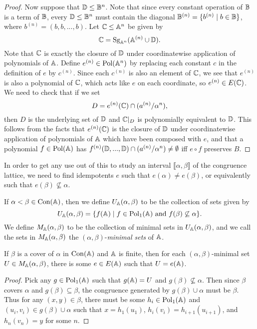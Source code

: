 \begin{appendices}
\begin{proof}
Now suppose that $\mathbb{D} \le \mathbb{B}^n$. Note that since every constant operation of $\mathbb{B}$ is a term of $\mathbb{B}$, every $\mathbb{D} \le \mathbb{B}^n$ must contain the diagonal $\mathbb{B}^{(n)} = \{b^{(n)} \mid b \in \mathbb{B}\}$, where $b^{(n)} = (b, b, ..., b)$. Let $\mathbb{C} \le \mathbb{A}^n$ be given by
\[
\mathbb{C} = \operatorname{Sg}_{\mathbb{A}^n}(\mathbb{A}^{(n)} \cup \mathbb{D}).
\]
Note that $\mathbb{C}$ is exactly the closure of $\mathbb{D}$ under coordinatewise application of polynomials of $\mathbb{A}$. Define $e^{(n)} \in \operatorname{Pol}(\mathbb{A}^n)$ by replacing each constant $c$ in the definition of $e$ by $c^{(n)}$. Since each $c^{(n)}$ is also an element of $\mathbb{C}$, we see that $e^{(n)}$ is also a polynomial of $\mathbb{C}$, which acts like $e$ on each coordinate, so $e^{(n)} \in E(\mathbb{C})$. We need to check that if we set
\[
D = e^{(n)}(\mathbb{C}) \cap (a^{(n)}/\alpha^n),
\]
then $D$ is the underlying set of $\mathbb{D}$ and $\mathbb{C}|_D$ is polynomially equivalent to $\mathbb{D}$. This follows from the facts that $e^{(n)}(\mathbb{C})$ is the closure of $\mathbb{D}$ under coordinatewise application of polynomials of $\mathbb{A}$ which have been composed with $e$, and that a polynomial $f \in \operatorname{Pol}(\mathbb{A})$ has $f^{(n)}(\mathbb{D}, ..., \mathbb{D}) \cap (a^{(n)}/\alpha^n) \ne \emptyset$ iff $e \circ f$ preserves $B$.
\end{proof}

In order to get any use out of this to study an interval $\llbracket \alpha, \beta \rrbracket$ of the congruence lattice, we need to find idempotents $e$ such that $e(\alpha) \ne e(\beta)$, or equivalently such that $e(\beta) \not\subseteq \alpha$.

\begin{defn} If $\alpha < \beta \in \operatorname{Con}(\mathbb{A})$, then we define $U_{\mathbb{A}}(\alpha, \beta)$ to be the collection of sets given by
\[
U_{\mathbb{A}}(\alpha, \beta) = \{f(\mathbb{A}) \mid f \in \operatorname{Pol}_1(\mathbb{A}) \text{ and } f(\beta) \not\subseteq \alpha\}.
\]
We define $M_{\mathbb{A}}(\alpha, \beta)$ to be the collection of minimal sets in $U_{\mathbb{A}}(\alpha, \beta)$, and we call the sets in $M_{\mathbb{A}}(\alpha, \beta)$ the $(\alpha, \beta)$-\emph{minimal sets} of $\mathbb{A}$.
\end{defn}

\begin{prop}\label{prop-prime-tame} If $\beta$ is a cover of $\alpha$ in $\operatorname{Con}(\mathbb{A})$ and $\mathbb{A}$ is finite, then for each $(\alpha,\beta)$-minimal set $U \in M_{\mathbb{A}}(\alpha,\beta)$, there is some $e \in E(\mathbb{A})$ such that $U = e(\mathbb{A})$.
\end{prop}
\begin{proof} Pick any $g \in \operatorname{Pol}_1(\mathbb{A})$ such that $g(\mathbb{A}) = U$ and $g(\beta) \not\subseteq \alpha$. Then since $\beta$ covers $\alpha$ and $g(\beta) \subseteq \beta$, the congruence generated by $g(\beta) \cup \alpha$ must be $\beta$. Thus for any $(x,y) \in \beta$, there must be some $h_i \in \operatorname{Pol}_1(\mathbb{A})$ and $(u_i,v_i) \in g(\beta) \cup \alpha$ such that $x = h_1(u_1)$, $h_i(v_i) = h_{i+1}(u_{i+1})$, and $h_n(v_n) = y$ for some $n$.


\end{proof}
\end{appendices}
